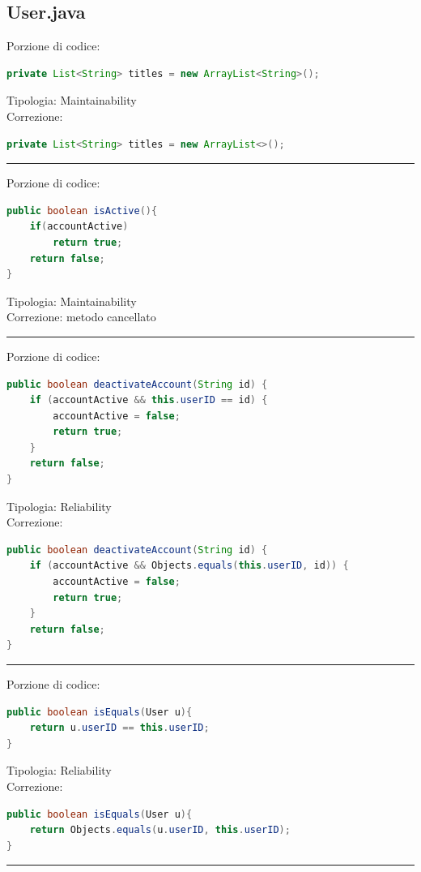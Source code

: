 \documentclass{article}
\begin{document}
\subsection{User.java}
Porzione di codice:
\begin{lstlisting}[language=Java]
private List<String> titles = new ArrayList<String>();
\end{lstlisting}
Tipologia: Maintainability\\
Correzione:
\begin{lstlisting}[language=Java]
private List<String> titles = new ArrayList<>();
\end{lstlisting}
\vspace{.5em}\hrule\vspace{.5em}
Porzione di codice:
\begin{lstlisting}[language=Java]
public boolean isActive(){
    if(accountActive)
        return true;
    return false;
}
\end{lstlisting}
Tipologia: Maintainability\\
Correzione: metodo cancellato
\vspace{.5em}\hrule\vspace{.5em}
Porzione di codice:
\begin{lstlisting}[language=Java]
public boolean deactivateAccount(String id) {
    if (accountActive && this.userID == id) {
        accountActive = false;
        return true;
    }
    return false;
}
\end{lstlisting}
Tipologia: Reliability\\
Correzione:
\begin{lstlisting}[language=Java]
public boolean deactivateAccount(String id) {
    if (accountActive && Objects.equals(this.userID, id)) {
        accountActive = false;
        return true;
    }
    return false;
}
\end{lstlisting}
\vspace{.5em}\hrule\vspace{.5em}
Porzione di codice:
\begin{lstlisting}[language=Java]
public boolean isEquals(User u){
    return u.userID == this.userID;
}
\end{lstlisting}
Tipologia: Reliability\\
Correzione:
\begin{lstlisting}[language=Java]
public boolean isEquals(User u){
    return Objects.equals(u.userID, this.userID);
}
\end{lstlisting}
\vspace{.5em}\hrule\vspace{.5em}
\end{document}
